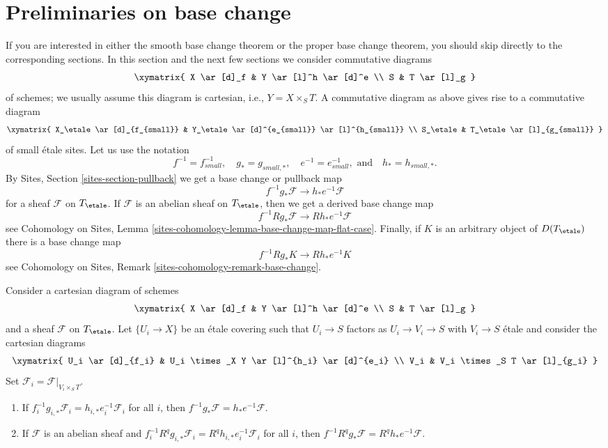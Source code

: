 \section{Preliminaries on base change}
\label{section-base-change-preliminaries}

\noindent
If you are interested in either the smooth base change theorem
or the proper base change theorem, you should skip directly to
the corresponding sections.
In this section and the next few sections we consider commutative diagrams
$$
\xymatrix{
X \ar[d]_f & Y \ar[l]^h \ar[d]^e \\
S & T \ar[l]_g
}
$$
of schemes; we usually assume this diagram is cartesian,
i.e., $Y = X \times_S T$. A commutative diagram as above
gives rise to a commutative diagram
$$
\xymatrix{
X_\etale \ar[d]_{f_{small}} & Y_\etale \ar[d]^{e_{small}} \ar[l]^{h_{small}} \\
S_\etale & T_\etale \ar[l]_{g_{small}}
}
$$
of small \'etale sites. Let us use the notation
$$
f^{-1} = f_{small}^{-1}, \quad
g_* = g_{small, *}, \quad
e^{-1} = e_{small}^{-1}, \text{ and}\quad
h_* = h_{small, *}.
$$
By Sites, Section \ref{sites-section-pullback}
we get a base change or pullback map
$$
f^{-1}g_*\mathcal{F}
\longrightarrow
h_*e^{-1}\mathcal{F}
$$
for a sheaf $\mathcal{F}$ on $T_\etale$. If $\mathcal{F}$ is an abelian
sheaf on $T_\etale$, then we get a derived base change map
$$
f^{-1}Rg_*\mathcal{F}
\longrightarrow
Rh_*e^{-1}\mathcal{F}
$$
see Cohomology on Sites, Lemma
\ref{sites-cohomology-lemma-base-change-map-flat-case}.
Finally, if $K$ is an arbitrary object of $D(T_\etale)$
there is a base change map
$$
f^{-1}Rg_*K
\longrightarrow
Rh_*e^{-1}K
$$
see
Cohomology on Sites, Remark \ref{sites-cohomology-remark-base-change}.

\begin{lemma}
\label{lemma-base-change-local}
Consider a cartesian diagram of schemes
$$
\xymatrix{
X \ar[d]_f & Y \ar[l]^h \ar[d]^e \\
S & T \ar[l]_g
}
$$
and a sheaf $\mathcal{F}$ on $T_\etale$. Let $\{U_i \to X\}$ be an
\'etale covering such that $U_i \to S$
factors as $U_i \to V_i \to S$ with $V_i \to S$ \'etale
and consider the cartesian diagrams
$$
\xymatrix{
U_i \ar[d]_{f_i} & U_i \times_X Y \ar[l]^{h_i} \ar[d]^{e_i} \\
V_i & V_i \times_S T \ar[l]_{g_i}
}
$$
Set $\mathcal{F}_i = \mathcal{F}|_{V_i \times_S T}$.
\begin{enumerate}
\item If $f_i^{-1}g_{i, *}\mathcal{F}_i = h_{i, *}e_i^{-1}\mathcal{F}_i$
for all $i$, then
$f^{-1}g_*\mathcal{F} = h_*e^{-1}\mathcal{F}$.
\item If $\mathcal{F}$ is an abelian sheaf and
$f_i^{-1}R^qg_{i, *}\mathcal{F}_i = R^qh_{i, *}e_i^{-1}\mathcal{F}_i$
for all $i$, then
$f^{-1}R^qg_*\mathcal{F} = R^qh_*e^{-1}\mathcal{F}$.
\end{enumerate}
\end{lemma}

